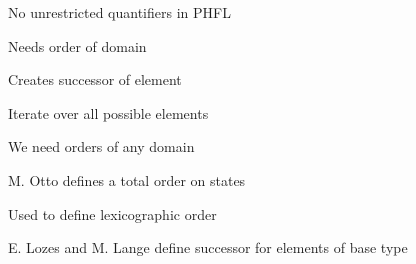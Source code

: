 \begin{frame}

\begin{compactenum}[$\bullet$]
\item<1-> No unrestricted quantifiers in PHFL
\item<3-> Needs order of domain
\item<4-> Creates successor of element
\item<2,5-> Iterate over all possible elements 
\end{compactenum}
\vspace{0.3cm}
 We need orders of any domain
\begin{compactenum}[$\bullet$]
\item<7-> M. Otto defines a total order on states
\item<8-> Used to define lexicographic order
\item<9-> E. Lozes and M. Lange define successor for elements of base type
\end{compactenum}
\end{frame}
